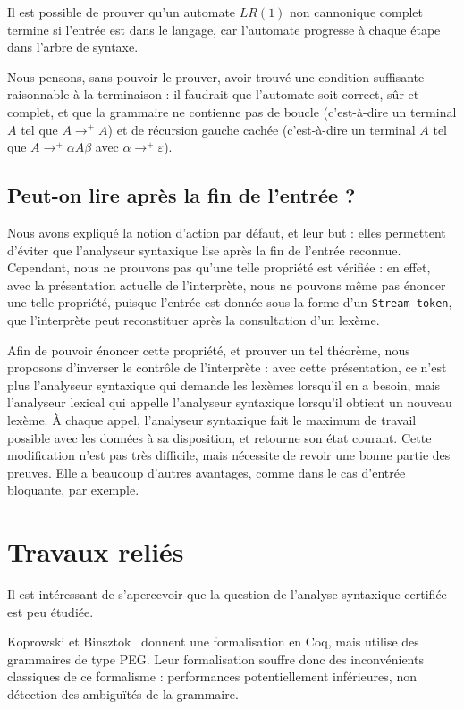 \documentclass[a4paper,11pt]{article}
\begin{document}
Il est possible de prouver qu'un automate $LR(1)$ non cannonique
complet termine si l'entrée est dans le langage, car l'automate
progresse à chaque étape dans l'arbre de syntaxe.

Nous pensons, sans pouvoir le prouver, avoir trouvé une condition
suffisante raisonnable à la terminaison : il faudrait que l'automate
soit correct, sûr et complet, et que la grammaire ne contienne pas de
boucle (c'est-à-dire un terminal $A$ tel que $A \rightarrow^+ A$) et
de récursion gauche cachée (c'est-à-dire un terminal $A$ tel que $A
\rightarrow^+ \alpha A \beta$ avec $\alpha \rightarrow^+
\varepsilon$).

\subsection{Peut-on lire après la fin de l'entrée ?}

Nous avons expliqué la notion d'action par défaut, et leur but : elles
permettent d'éviter que l'analyseur syntaxique lise après la fin de
l'entrée reconnue. Cependant, nous ne prouvons pas qu'une telle
propriété est vérifiée : en effet, avec la présentation actuelle de
l'interprète, nous ne pouvons même pas énoncer une telle propriété,
puisque l'entrée est donnée sous la forme d'un \verb+Stream token+,
que l'interprète peut reconstituer après la consultation d'un lexème.

Afin de pouvoir énoncer cette propriété, et prouver un tel théorème,
nous proposons d'inverser le contrôle de l'interprète : avec cette
présentation, ce n'est plus l'analyseur syntaxique qui demande les
lexèmes lorsqu'il en a besoin, mais l'analyseur lexical qui appelle
l'analyseur syntaxique lorsqu'il obtient un nouveau lexème. \`A chaque
appel, l'analyseur syntaxique fait le maximum de travail possible avec
les données à sa disposition, et retourne son état courant. Cette
modification n'est pas très difficile, mais nécessite de revoir une
bonne partie des preuves. Elle a beaucoup d'autres avantages, comme
dans le cas d'entrée bloquante, par exemple.

\section{Travaux reliés}

Il est intéressant de s'apercevoir que la question de l'analyse
syntaxique certifiée est peu étudiée.

Koprowski et Binsztok~\cite{trx} donnent une formalisation en Coq,
mais utilise des grammaires de type PEG. Leur formalisation souffre
donc des inconvénients classiques de ce formalisme : performances
potentiellement inférieures, non détection des ambiguïtés de la grammaire.
\end{document}
